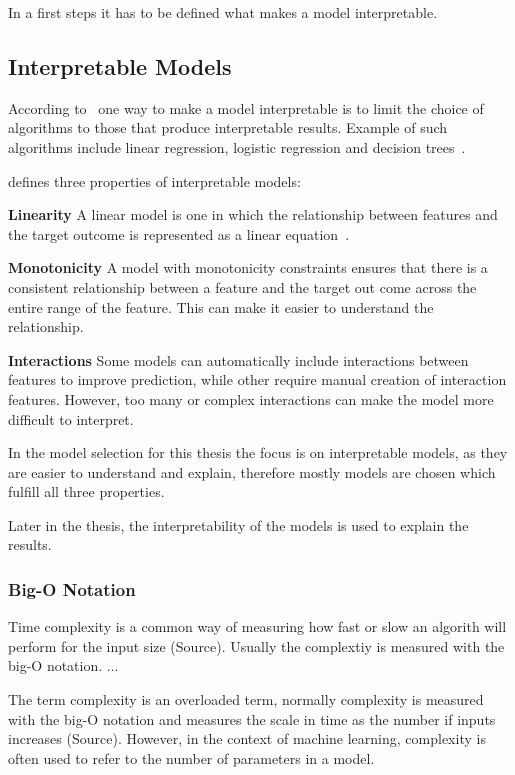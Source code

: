 In a first steps it has to be defined what makes a model interpretable.

\subsection*{Interpretable Models}
According to~\cite{molnar2020interpretable} one way to make a model interpretable is to limit the
choice of algorithms to those that produce interpretable results. Example of such
algorithms include linear regression, logistic regression and decision trees~\cite[p.
35]{molnar2020interpretable}.

\cite{molnar2020interpretable} defines three properties of interpretable models:

\textbf{Linearity} A linear model is one in which the relationship between features and the
target outcome is represented as a linear equation~\cite[]{molnar2020interpretable}.

\textbf{Monotonicity} A model with monotonicity constraints ensures that there is a consistent
relationship between a feature and the target out come across the entire range of the feature.
This can make it easier to understand the relationship.

\textbf{Interactions} Some models can automatically include
interactions between features to improve prediction, while other require manual creation of
interaction features.
However, too many or complex interactions can make the model more
difficult to interpret.

In the model selection for this thesis the focus is on interpretable models, as they are easier to
understand and explain, therefore mostly models are chosen which fulfill all three
properties.

Later in the thesis, the interpretability of the models is used to explain the results.

\subsubsection*{Big-O Notation}

Time complexity is a common way of measuring how fast or slow an algorith will perform for the
input size (Source). Usually the complextiy is measured with the big-O notation.
...

The term complexity is an overloaded term, normally complexity is measured with the big-O
notation and measures the scale in time as the number if inputs increases (Source).
However, in the context of machine learning, complexity is often used to refer to the
number of parameters in a model.

